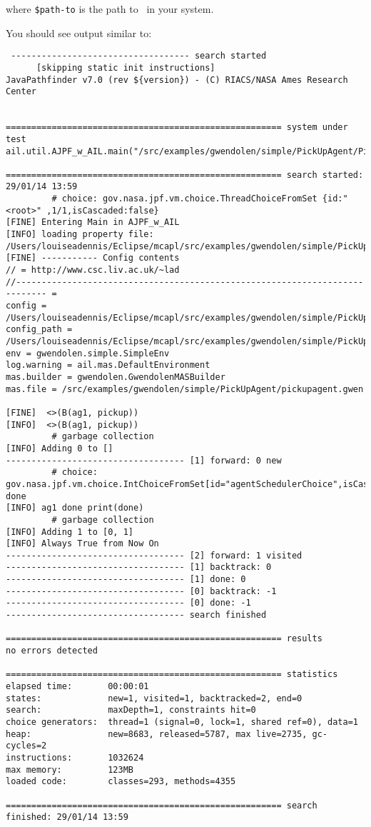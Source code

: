 \noindent where \texttt{\${path-to}} is the path to \ajpfversion\ in your system.

You should see output similar to: 

\noindent \begin{lstlisting}
 ----------------------------------- search started
      [skipping static init instructions]
JavaPathfinder v7.0 (rev ${version}) - (C) RIACS/NASA Ames Research Center


====================================================== system under test
ail.util.AJPF_w_AIL.main("/src/examples/gwendolen/simple/PickUpAgent/PickUpAgent.ail","/src/examples/gwendolen/simple/PickUpAgent/PickUpAgent.psl","0")

====================================================== search started: 29/01/14 13:59
		 # choice: gov.nasa.jpf.vm.choice.ThreadChoiceFromSet {id:"<root>" ,1/1,isCascaded:false}
[FINE] Entering Main in AJPF_w_AIL
[INFO] loading property file: /Users/louiseadennis/Eclipse/mcapl/src/examples/gwendolen/simple/PickUpAgent/PickUpAgent.ail
[FINE] ----------- Config contents
// = http://www.csc.liv.ac.uk/~lad
//---------------------------------------------------------------------------- = 
config = /Users/louiseadennis/Eclipse/mcapl/src/examples/gwendolen/simple/PickUpAgent/PickUpAgent.ail
config_path = /Users/louiseadennis/Eclipse/mcapl/src/examples/gwendolen/simple/PickUpAgent
env = gwendolen.simple.SimpleEnv
log.warning = ail.mas.DefaultEnvironment
mas.builder = gwendolen.GwendolenMASBuilder
mas.file = /src/examples/gwendolen/simple/PickUpAgent/pickupagent.gwen

[FINE]  <>(B(ag1, pickup))
[INFO]  <>(B(ag1, pickup))
		 # garbage collection
[INFO] Adding 0 to []
----------------------------------- [1] forward: 0 new
		 # choice: gov.nasa.jpf.vm.choice.IntChoiceFromSet[id="agentSchedulerChoice",isCascaded:false,>0]
done
[INFO] ag1 done print(done)
		 # garbage collection
[INFO] Adding 1 to [0, 1]
[INFO] Always True from Now On
----------------------------------- [2] forward: 1 visited
----------------------------------- [1] backtrack: 0
----------------------------------- [1] done: 0
----------------------------------- [0] backtrack: -1
----------------------------------- [0] done: -1
----------------------------------- search finished

====================================================== results
no errors detected

====================================================== statistics
elapsed time:       00:00:01
states:             new=1, visited=1, backtracked=2, end=0
search:             maxDepth=1, constraints hit=0
choice generators:  thread=1 (signal=0, lock=1, shared ref=0), data=1
heap:               new=8683, released=5787, max live=2735, gc-cycles=2
instructions:       1032624
max memory:         123MB
loaded code:        classes=293, methods=4355

====================================================== search finished: 29/01/14 13:59
\end{lstlisting}

